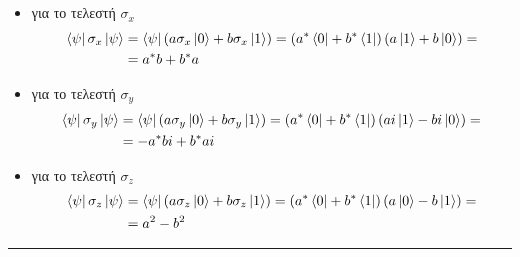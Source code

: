 \documentclass[12pt]{article}
\begin{document}
\section*{{}}
\begin{itemize}
    \item για το τελεστή $\sigma_x$
    \begin{align*}
        \bra{\psi}\sigma_x\ket{\psi} &= \bra{\psi}\left(a\sigma_x \ket{0}+b\sigma_x\ket{1}\right)= \left(a^*\bra{0}+b^*\bra{1}\right)\left(a\ket{1}+b\ket{0}\right)=\\
        &=a^*b+b^*a
    \end{align*}
    \item για το τελεστή $\sigma_y$
    \begin{align*}
        \bra{\psi}\sigma_y\ket{\psi} &= \bra{\psi}\left(a\sigma_y \ket{0}+b\sigma_y\ket{1}\right)= \left(a^*\bra{0}+b^*\bra{1}\right)\left(ai\ket{1}-bi\ket{0}\right)=\\
        &=-a^*bi+b^*ai
    \end{align*}
    \item για το τελεστή $\sigma_z$
    \begin{align*}
        \bra{\psi}\sigma_z\ket{\psi} &= \bra{\psi}\left(a\sigma_z \ket{0}+b\sigma_z\ket{1}\right)= \left(a^*\bra{0}+b^*\bra{1}\right)\left(a\ket{0}-b\ket{1}\right)=\\
        &=a^2-b^2
    \end{align*}            
    \end{itemize}
    \rule{\textwidth}{.5pt}
\end{document}
